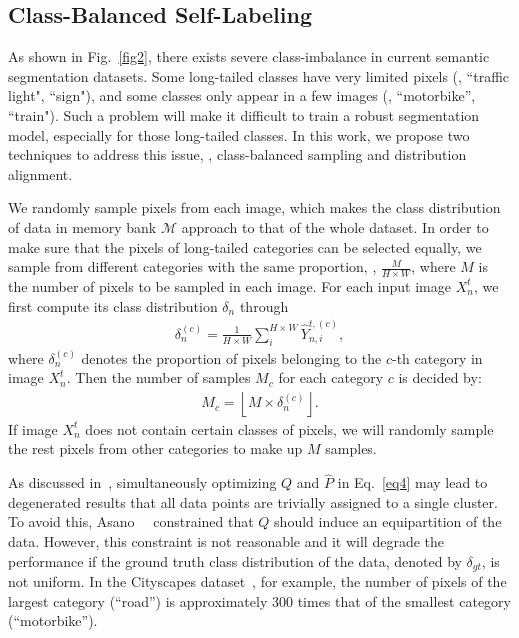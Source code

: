 \documentclass[10pt,twocolumn,letterpaper]{article}
\begin{document}
	\subsection{Class-Balanced Self-Labeling}
	\label{sec3.3}
	As shown in Fig.~\ref{fig2}, there exists severe class-imbalance in current semantic segmentation datasets. Some long-tailed classes have very limited pixels (\eg, ``traffic light", ``sign"), and some classes only appear in a few images (\eg, ``motorbike'', ``train"). Such a problem will make it difficult to train a robust segmentation model, especially for those long-tailed classes. In this work, we propose two techniques to address this issue, \ie, class-balanced sampling and distribution alignment.
	
	\vspace{0.5em} 
	We randomly sample pixels from each image, which makes the class distribution of data in memory bank $\mathcal{M}$ approach to that of the whole dataset. In order to make sure that the pixels of long-tailed categories can be selected equally, we sample from different categories with the same proportion, \ie, $\frac{M}{H\times W}$, where $M$ is the number of pixels to be sampled in each image. For each input image $X_n^t$, we first compute its class distribution $\delta_n$ through 
	\begin{align}
		\label{eq7}
		\delta_n^{(c)}=\frac{1}{ H\times W}\sum_{i}^{H\times W}\hat{Y}^{t,(c)}_{n,i},
	\end{align}
	where $\delta^{(c)}_n$ denotes the proportion of pixels belonging to the $c$-th category in image $X_n^t$. Then the number of samples $M_c$ for each category $c$ is decided by: 
	\begin{align}
		M_c = \left \lfloor M\times \delta_n^{(c)}\right \rfloor.
	\end{align} 
	If image $X_n^t$ does not contain certain classes of pixels, we will randomly sample the rest pixels from other categories to make up $M$ samples.
	
	\vspace{0.5em} 
	As discussed in~\cite{asano2020self,caron2018deep}, simultaneously optimizing $Q$ and $\hat{P}$ in Eq.~\ref{eq4} may lead to degenerated results that all data points are trivially assigned to a single cluster. To avoid this, Asano~\etal~\cite{asano2020self} constrained that $Q$ should induce an equipartition of the data. However, this constraint is not reasonable and it will degrade the performance if the ground truth class distribution of the data, denoted by $\delta_{gt}$, is not uniform. In the Cityscapes dataset~\cite{cordts2016cityscapes}, for example, the number of pixels of the largest category (``road'') is approximately 300 times that of the smallest category (``motorbike''). 
	
\end{document}
